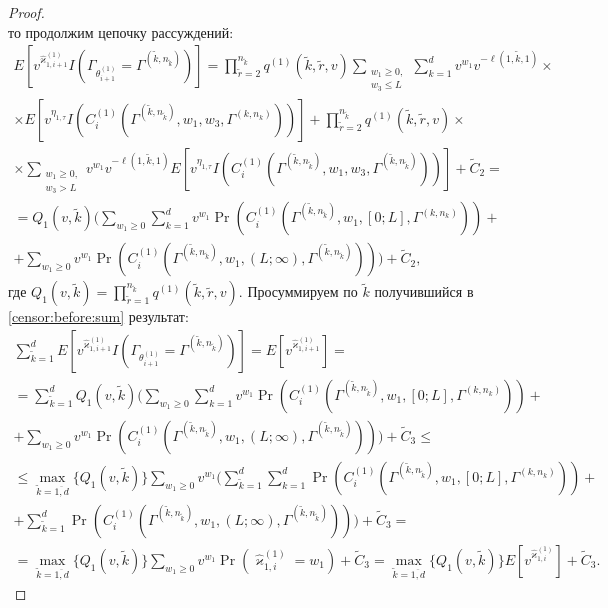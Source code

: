 \begin{proof}
$$$$
то продолжим цепочку рассуждений:
\begin{multline}
E[v^{\hat{\varkappa}_{1,i+1}^{(1)}} I(\Gamma_{\theta_{i+1}^{(1)}}= \Gamma^{(\tilde{k},n_{\tilde{k}})})]= \prod_{\tilde{r}=2}^{n_{\tilde{k}}} q^{(1)}(\tilde{k},\tilde{r},v) \sum_{\substack{w_1\geqslant 0, \\ w_3 \leqslant L}} \sum_{k=1}^d v^{w_1} v^{- \ell(1,\tilde{k},1)} \times \\ \times E[v^{ \eta_{1,\tau} } I( C_i^{(1)}(\Gamma^{(\tilde{k},n_{\tilde{k}})},w_1,w_3,\Gamma^{(k,n_k)} ))] +
\prod_{\tilde{r}=2}^{n_{\tilde{k}}} q^{(1)}(\tilde{k},\tilde{r},v)\times \\ \times \sum_{\substack{w_1\geqslant 0, \\ w_3 > L}} v^{w_1}v^{- \ell(1,\tilde{k},1)}  E[v^{ \eta_{1,\tau}} I( C_i^{(1)}(\Gamma^{(\tilde{k},n_{\tilde{k}})},w_1,w_3,\Gamma^{(\tilde{k},n_{\tilde{k}})} ))] + \widetilde{C}_2 = \\
  = Q_1(v,\tilde{k})  \biggl(\sum_{w_1\geqslant 0} \sum_{k=1}^d v^{w_1} \Pr(C_i^{(1)}(\Gamma^{(\tilde{k},n_{\tilde{k}})},w_1,[0;L],\Gamma^{(k,n_k)} )) + \\
   + \sum_{w_1\geqslant 0}  v^{w_1} \Pr(C_i^{(1)}(\Gamma^{(\tilde{k},n_{\tilde{k}})},w_1,(L;\infty),\Gamma^{(\tilde{k},n_{\tilde{k}})} ))\biggr) + \widetilde{C}_2,
   \label{censor:before:sum}
  \end{multline}
где $Q_1(v,\tilde{k})= \prod_{\tilde{r}=1}^{n_{\tilde{k}}} q^{(1)}(\tilde{k},\tilde{r},v) $. Просуммируем по $\tilde{k}$ получившийся в \eqref{censor:before:sum} результат:
\allowdisplaybreaks
\begin{multline*}
\sum_{\tilde{k}=1}^d E[v^{\hat{\varkappa}_{1,i+1}^{(1)}} I(\Gamma_{\theta_{i+1}^{(1)}}= \Gamma^{(\tilde{k},n_{\tilde{k}})})]=   E[v^{\hat{\varkappa}_{1,i+1}^{(1)}} ]=\\
  = \sum_{\tilde{k}=1}^d Q_1(v,\tilde{k})  \biggl(\sum_{w_1\geqslant 0} \sum_{k=1}^d v^{w_1} \Pr(C_i^{(1)}(\Gamma^{(\tilde{k},n_{\tilde{k}})},w_1,[0;L],\Gamma^{(k,n_k)} )) + \\
   + \sum_{w_1\geqslant 0}  v^{w_1} \Pr(C_i^{(1)}(\Gamma^{(\tilde{k},n_{\tilde{k}})},w_1,(L;\infty),\Gamma^{(\tilde{k},n_{\tilde{k}})} ))\biggr) + \widetilde{C}_3 \leqslant \\ \leqslant
   \max_{ \tilde{k}=\overline{1,d} }{\{Q_1(v,\tilde{k}) \}} \sum_{w_1\geqslant 0}  v^{w_1} \biggl(\sum_{\tilde{k}=1}^d \sum_{k=1}^d  \Pr(C_i^{(1)}(\Gamma^{(\tilde{k},n_{\tilde{k}})},w_1,[0;L],\Gamma^{(k,n_k)} )) + \\
   +  \sum_{\tilde{k}=1}^d \Pr(C_i^{(1)}(\Gamma^{(\tilde{k},n_{\tilde{k}})},w_1,(L;\infty),\Gamma^{(\tilde{k},n_{\tilde{k}})} ))\biggr) + \widetilde{C}_3 = \\
   =\max_{ \tilde{k}=\overline{1,d} }{\{Q_1(v,\tilde{k}) \}} \sum_{w_1\geqslant 0}  v^{w_1} \Pr(\hat{\varkappa}_{1,i}^{(1)}=w_1)+ \widetilde{C}_3=\max_{ \tilde{k}=\overline{1,d} }{\{Q_1(v,\tilde{k}) \}} E[v^{\hat{\varkappa}_{1,i}^{(1)}} ]+ \widetilde{C}_3.
  \end{multline*}


\end{proof}
